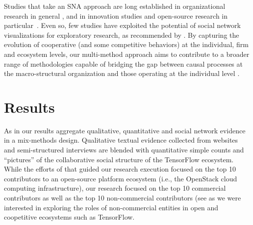 \documentclass[CHICAGO,Times1COL]{WileyNJDv5} %
\begin{document}
Studies that take an SNA approach are long established in organizational research in general \citep{tichy1979social,uzzi1997social,cross2002making,tsai2002social, rowley2005time,kane_et_al2014_SNA_at_MISQ}, 
and in innovation studies  \citep{ValkGijsbers2010,Kolleck2013} and open-source research in particular~\citep{crowston_social_2005,martinez2008using,zanettiicse_2013}. Even so, few studies have exploited the potential of social network visualizations for exploratory research, as recommended by \citet{CarringtonScott_et_al2005}.
By capturing the evolution of cooperative (and some competitive behaviors) at the individual, firm and ecosystem levels,  our multi-method approach aims to contribute to a
broader range of methodologies capable of bridging the gap between causal processes at the macro-structural organization and those operating at the individual level
\citep[see][]{ibarra_etall_2005}. 










\section{Results\label{sec:results}}

As in \citet{teixeira2015lessons,TeixeiraMian_et_al2016,Nooraie_et_al2020,kolleck2014analyzing} our results aggregate qualitative, quantitative and social network evidence in a mix-methods design.  Qualitative textual evidence collected from websites and semi-structured interviews 
 are blended with quantitative simple counts and  ``pictures'' of the collaborative social structure of the TensorFlow ecosystem.  While the efforts of \citet{teixeira2015lessons,TeixeiraMian_et_al2016} that guided our research execution focused on the top 10 contributors to an open-source platform ecosystem (i.e., the OpenStack cloud computing infrastructure), our research focused on the top 10 commercial contributors as well as the top 10 non-commercial contributors (see  as we were interested in exploring the roles of non-commercial entities in open and coopetitive ecosystems such as TensorFlow. 
\end{document}
